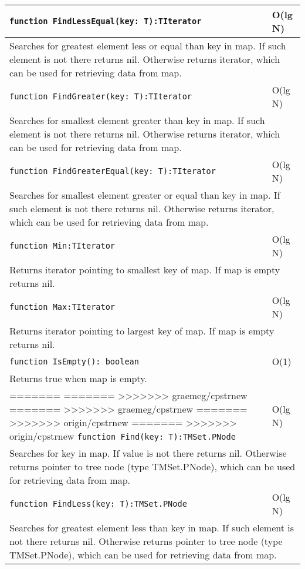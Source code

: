 \begin{longtable}{|m{10cm}|m{5cm}|}
\verb!function FindLessEqual(key: T):TIterator! & O(lg N) \\\hline
\multicolumn{2}{|m{15cm}|}{Searches for greatest element less or equal than key in map. If such element is not there returns nil. Otherwise
returns iterator, which can be used for retrieving data from map.} \\\hline\hline

\verb!function FindGreater(key: T):TIterator! & O(lg N) \\\hline
\multicolumn{2}{|m{15cm}|}{Searches for smallest element greater than key in map. If such element is not there returns nil. Otherwise
returns iterator, which can be used for retrieving data from map.} \\\hline\hline

\verb!function FindGreaterEqual(key: T):TIterator! & O(lg N) \\\hline
\multicolumn{2}{|m{15cm}|}{Searches for smallest element greater or equal than key in map. If such element is not there returns nil. Otherwise
returns iterator, which can be used for retrieving data from map.} \\\hline\hline

\verb!function Min:TIterator! & O(lg N) \\\hline
\multicolumn{2}{|m{15cm}|}{Returns iterator pointing to smallest key of map. If map is empty returns
nil.} \\\hline\hline

\verb!function Max:TIterator! & O(lg N) \\\hline
\multicolumn{2}{|m{15cm}|}{Returns iterator pointing to largest key of map. If map is empty returns
nil.} \\\hline\hline

\verb!function IsEmpty(): boolean! & O(1) \\ \hline
\multicolumn{2}{|m{15cm}|}{Returns true when map is empty.} \\\hline

=======
=======
>>>>>>> graemeg/cpstrnew
=======
>>>>>>> graemeg/cpstrnew
=======
>>>>>>> origin/cpstrnew
=======
>>>>>>> origin/cpstrnew
\verb!function Find(key: T):TMSet.PNode! & O(lg N) \\\hline
\multicolumn{2}{|m{15cm}|}{Searches for key in map. If value is not there returns nil. Otherwise
returns pointer to tree node (type TMSet.PNode), which can be used for retrieving data from map.} \\\hline\hline

\verb!function FindLess(key: T):TMSet.PNode! & O(lg N) \\\hline
\multicolumn{2}{|m{15cm}|}{Searches for greatest element less than key in map. If such element is not there returns nil. Otherwise
returns pointer to tree node (type TMSet.PNode), which can be used for retrieving data from map.} \\\hline\hline


\end{longtable}

